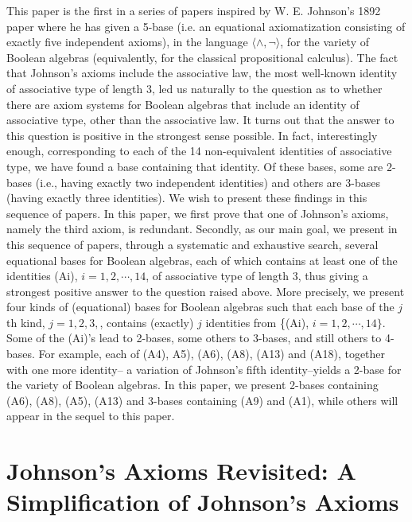 \documentclass{amsart}
\theoremstyle{plain}
\theoremstyle{problem}
\theoremstyle{definition}
\theoremstyle{remark}
\numberwithin{equation}{section}
\begin{document}
 This paper is the first in a series of  papers inspired by W. E. Johnson's 1892 paper \cite{Jo92c} where he has given a 5-base (i.e. an equational axiomatization consisting of exactly five independent axioms), in the language $\langle \land, \neg \rangle$, for the variety of Boolean algebras (equivalently, for the classical propositional calculus).  The fact that Johnson's axioms include the associative law, the most well-known identity of associative type of length 3, led us naturally to  the question as to whether there are axiom systems for Boolean algebras that include an identity of associative type, other than the associative law.  It turns out that the answer to this question is positive in the strongest sense possible.  In fact, interestingly enough, corresponding to each of the 14 non-equivalent identities of associative type, we have found a base containing that identity.  Of these bases, some are 2-bases (i.e., having exactly two independent identities) and others are 3-bases (having exactly three identities).  We wish to present these findings in this sequence of  papers.  In this paper, we first prove that one of Johnson's axioms, namely the third axiom, is redundant.  
Secondly, as our main goal, we present in this sequence of papers, through a systematic and exhaustive search, several equational bases for Boolean algebras, each of which contains at least one of the identities (Ai), $i=1, 2, \cdots, 14$, of associative type of length 3, thus giving a strongest positive answer to the question raised above.  More precisely, we present 
four kinds %
of (equational) bases for Boolean algebras such that 
  each base of the $j$th kind, $j=1,2,3,$, contains (exactly) $j$ identities from \{(Ai), $i=1, 2, \cdots, 14\}$.
 Some of the (Ai)'s 
 lead to 2-bases, some others to 3-bases, and still others to 4-bases.  For example, each of (A4), A5), (A6), (A8), (A13) and (A18), together with one more identity-- a variation of Johnson's fifth identity--yields a 2-base for the variety of Boolean algebras.  In this paper, we present 2-bases containing (A6), (A8), (A5), (A13) and 3-bases containing (A9) and (A1), while others will appear in the sequel to this paper.


\medskip
\section{Johnson's Axioms Revisited: A Simplification of Johnson's Axioms} 
\end{document}
